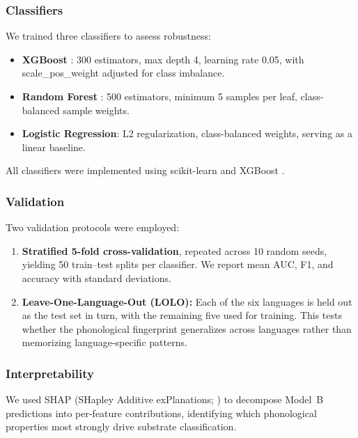 \documentclass[12pt]{article}
\begin{document}
\subsubsection{Classifiers}

We trained three classifiers to assess robustness:

\begin{itemize}
    \item \textbf{XGBoost} \citep{chen2016}: 300 estimators, max depth 4, learning rate 0.05, with scale\_pos\_weight adjusted for class imbalance.
    \item \textbf{Random Forest} \citep{breiman2001}: 500 estimators, minimum 5 samples per leaf, class-balanced sample weights.
    \item \textbf{Logistic Regression}: L2 regularization, class-balanced weights, serving as a linear baseline.
\end{itemize}

All classifiers were implemented using scikit-learn \citep{pedregosa2011} and XGBoost \citep{chen2016}.

\subsubsection{Validation}

Two validation protocols were employed:

\begin{enumerate}
    \item \textbf{Stratified 5-fold cross-validation}, repeated across 10 random seeds, yielding 50 train--test splits per classifier. We report mean AUC, F1, and accuracy with standard deviations.
    \item \textbf{Leave-One-Language-Out (LOLO):} Each of the six languages is held out as the test set in turn, with the remaining five used for training. This tests whether the phonological fingerprint generalizes across languages rather than memorizing language-specific patterns.
\end{enumerate}

\subsubsection{Interpretability}

We used SHAP (SHapley Additive exPlanations; \citealp{lundberg2017}) to decompose Model~B predictions into per-feature contributions, identifying which phonological properties most strongly drive substrate classification.
\end{document}
